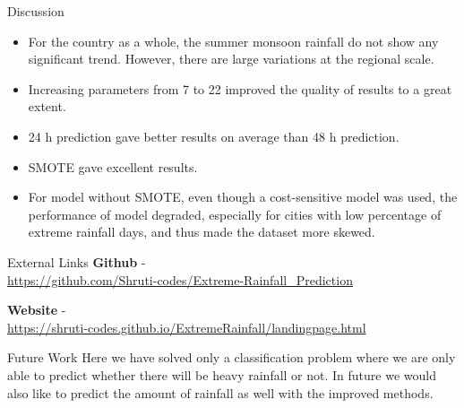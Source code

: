 \documentclass[11pt]{beamer}
\begin{document}
\begin{frame}{Discussion}
\begin{itemize}
\item For the country as a whole, the summer monsoon rainfall do not show any significant trend. However, there are large variations at the regional scale.
\item Increasing parameters from 7 to 22 improved the quality of results to a great extent.
\item 24 h prediction gave better results on average than 48 h prediction.
\item SMOTE gave excellent results.
\item For model without SMOTE, even though a cost-sensitive model was used, the performance of model degraded, especially for cities with low percentage of extreme rainfall days, and thus made the dataset more skewed.
\end{itemize}
\end{frame}

\begin{frame}{External Links}
\textbf{Github} - \\
\url{https://github.com/Shruti-codes/Extreme-Rainfall_Prediction}

\medskip

\textbf{Website} - \\
\url{https://shruti-codes.github.io/ExtremeRainfall/landingpage.html}
\end{frame}

\begin{frame}{Future Work}
Here we have solved only a classification problem where we are only able to predict whether there will be heavy rainfall or not. In future we would also like to predict the amount of rainfall as well with the improved methods.
\end{frame}
\end{document}
